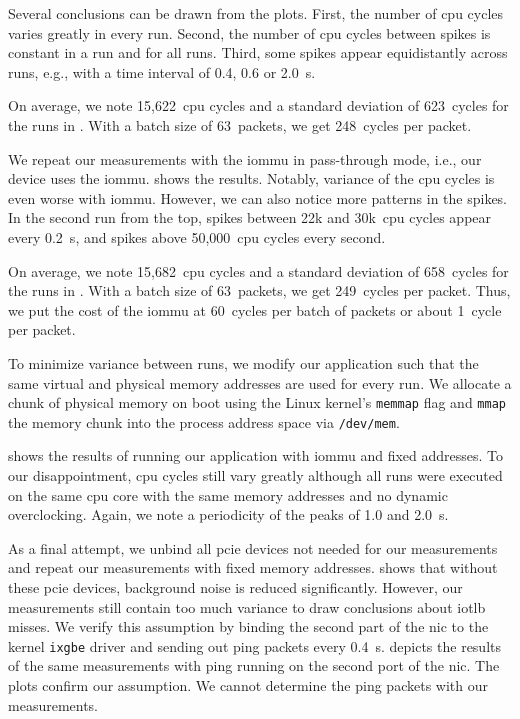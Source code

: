 Several conclusions can be drawn from the plots. First, the number of \ac{cpu}
cycles varies greatly in every run. Second, the number of \ac{cpu} cycles
between spikes is constant in a run and for all runs. Third, some spikes appear
equidistantly across runs, e.g., with a time interval of 0.4, 0.6 or
\SI{2.0}{\s}.

On average, we note 15,622~\ac{cpu} cycles and a standard deviation of
623~cycles for the runs in . With a batch size of
63~packets, we get 248~cycles per packet.

We repeat our measurements with the \ac{iommu} in pass-through mode, i.e.,
our device uses the \ac{iommu}.  shows the results.
Notably, variance of the \ac{cpu} cycles is even worse with \ac{iommu}. However,
we can also notice more patterns in the spikes. In the second run from the top,
spikes between 22k and 30k~\ac{cpu} cycles appear every \SI{0.2}{\s}, and spikes
above 50,000~\ac{cpu} cycles every second.

On average, we note 15,682~\ac{cpu} cycles and a standard deviation of
658~cycles for the runs in . With a batch size of
63~packets, we get 249~cycles per packet. Thus, we put the cost of the
\ac{iommu} at 60~cycles per batch of packets or about 1~cycle per packet.

To minimize variance between runs, we modify our application such that the same
virtual and physical memory addresses are used for every run. We allocate a
chunk of physical memory on boot using the Linux kernel's \texttt{memmap} flag
and \texttt{mmap} the memory chunk into the process address space via
\texttt{/dev/mem}.

 shows the results of running our application
with \ac{iommu} and fixed addresses. To our disappointment, \ac{cpu} cycles
still vary greatly although all runs were executed on the same \ac{cpu} core
with the same memory addresses and no dynamic overclocking. Again, we note a
periodicity of the peaks of 1.0 and \SI{2.0}{\s}.

As a final attempt, we unbind all \ac{pcie} devices not needed for our
measurements and repeat our measurements with fixed memory addresses.
 shows that without these \ac{pcie}
devices, background noise is reduced significantly. However, our measurements
still contain too much variance to draw conclusions about \ac{iotlb} misses. We
verify this assumption by binding the second part of the \ac{nic} to the kernel
\texttt{ixgbe} driver and sending out ping packets every \SI{0.4}{\s}.
 depicts the results of the same
measurements with ping running on the second port of the \ac{nic}. The plots
confirm our assumption. We cannot determine the ping packets with our
measurements.


